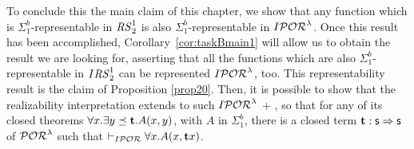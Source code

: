 {To conclude this the main claim of this chapter,
we show that
any function
which is $\Sigma^b_1$-representable
in ${\mathit{RS}^1_2}$ is also $\Sigma^b_1$-representable
in $I\mathcal{POR}^\lambda$. Once this result has been accomplished,
Corollary~\ref{cor:taskBmain1}
will allow us to obtain the result we are looking for,
asserting that all the functions which are
also $\Sigma^b_1$-representable
in $I{\mathit{RS}^1_2}$ can be represented $I\mathcal{POR}^\lambda$, too. This representability
result is the claim of Proposition \ref{prop20}.
%
Then, it is possible to show that the realizability
interpretation extends to such
$I\mathcal{POR}^\lambda$ + \EM{}, so that
for any of its closed theorems
$\forall x.\exists y\preceq {\mathbf t}.A(x,y)$,
with $A$ in $\Sigma^b_1$,
there is a closed term ${\mathbf t}:\mathsf{s} \Rightarrow
\mathsf{s}$ of $\mathcal{POR}^\lambda$ such that
$\vdash_{I\mathcal{POR}} \forall x.A(x,{\mathbf t} x)$.
%
%
%
%
%
%
%
%
%
%
%
%
%
%
%
%
%
%
%
%
%
%
%
%
%
%
%
%
%
%
}

